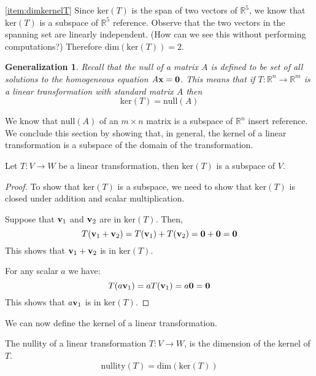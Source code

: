 \documentclass{ximera}
\renewcommand{\vec}[1]{{\bf #1}}
\newcommand{\RR}{\mathbb{R}}
\newcommand{\dfn}{\textit}
\newtheorem{general}{Generalization}
\begin{document}
\begin{example}
\begin{explanation}
\ref{item:dimkernelT}  Since $\text{ker}(T)$ is the span of two vectors of $\RR^5$, we know that $\text{ker}(T)$ is a subspace of $\RR^5$ {\color{red} reference}.  Observe that the two vectors in the spanning set are linearly independent. (How can we see this without performing computations?)  Therefore $\text{dim}(\text{ker}(T))=2$.
\end{explanation}
\end{example}

\begin{general}
Recall that the \dfn{null} of a matrix $A$ is defined to be set of all solutions to the homogeneous equation $A\vec{x}=\vec{0}$. This means that  if $T:\RR^n\rightarrow \RR^m$ is a linear transformation with standard matrix $A$ then
$$\text{ker}(T)=\text{null}(A)$$
\end{general}
We know that $\text{null}(A)$ of an $m\times n$ matrix is a subspace of $\RR^n$ {\color{red} insert reference}.  We conclude this section by showing that, in general, the kernel of a linear transformation is a subspace of the domain of the transformation.
\begin{theorem}\label{th:kersubspace} Let $T:V\rightarrow W$ be a linear transformation, then $\text{ker}(T)$ is a subspace of $V$.
\end{theorem}
\begin{proof}
To show that $\text{ker}(T)$ is a subspace, we need to show that $\text{ker}(T)$ is closed under addition and scalar multiplication.

Suppose that $\vec{v}_1$ and $\vec{v}_2$ are in $\text{ker}(T)$.  Then,
$$T(\vec{v}_1+\vec{v}_2)=T(\vec{v}_1)+T(\vec{v}_2)=\vec{0}+\vec{0}=\vec{0}$$
This shows that $\vec{v}_1+\vec{v}_2$ is in $\text{ker}(T)$.

For any scalar $a$ we have:
$$T(a\vec{v}_1)=aT(\vec{v}_1)=a\vec{0}=\vec{0}$$
This shows that $a\vec{v}_1$ is in $\text{ker}(T)$.

\end{proof}

We can now define the kernel of a linear transformation.

\begin{definition}\label{def:nullityT}
The nullity of a linear transformation $T:V\rightarrow W$, is the dimension of the kernel of $T$.
$$\text{nullity}(T)=\text{dim}(\text{ker}(T))$$
\end{definition}
\end{document}
